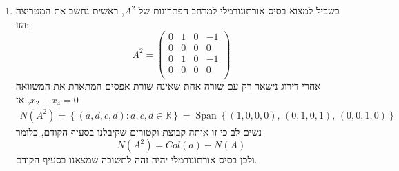 \documentclass[12pt, a4paper]{article}
\newcommand{\rr}{\mathbb{R}}
\DeclareMathOperator{\Span}{Span}
\begin{document}
\begin{enumerate}
\begin{enumerate}
$\bullet$
\underline{הערה שנייה:}
שימו לב כי אם מבצעים גראם-שמידט על הוקטורים בסדר אחר, יכול להתקבל בסיס אורתונורמלי שנראה אחרת, וזה בסדר גמור. אין כאן תשובה יחידה- יש אינסוף בסיסים אורתונורמלים המהווים תשובה לשאלה.
    \item 
    בשביל למצוא בסיס אורתונורמלי למרחב הפתרונות של
    $A^2$,
    ראשית נחשב את המטריצה הזו:
    $$A^2=
    \begin{pmatrix}
        0&1&0&-1\\
        0&0&0&0\\
        0&1&0&-1\\
        0&0&0&0\\
    \end{pmatrix}$$
    אחרי דירוג נישאר רק עם שורה אחת שאינה שורת אפסים המתארת את המשוואה
    $x_2-x_4=0$,
    אז
    \begin{align*}
        N(A^2)=\left\{
(a,d,c,d): a,c,d\in\rr
        \right\}=\Span
        \left\{
(1,0,0,0),\, (0,1,0,1),\, (0,0,1,0)
\right\}
    \end{align*}
    נשים לב כי זו אותה קבוצת וקטורים שקיבלנו בסעיף הקודם, כלומר
    $$N(A^2)=Col(a)+N(A)$$
    ולכן בסיס אורתונורמלי יהיה זהה לתשובה שמצאנו בסעיף הקודם.
\end{enumerate}
\ \pagebreak


\end{enumerate}
\end{document}
